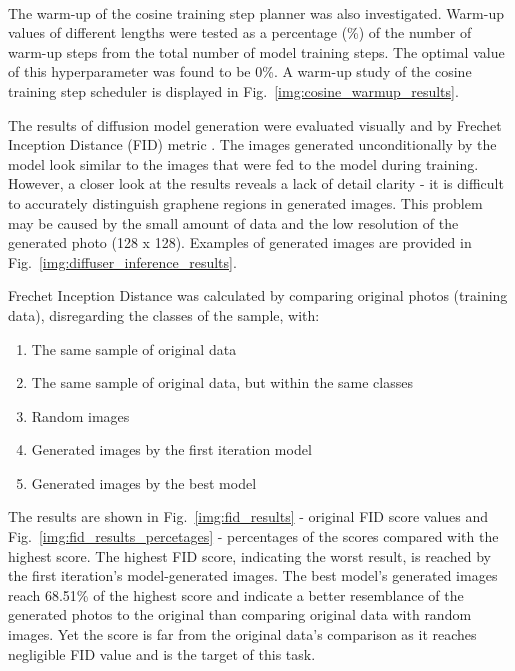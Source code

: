 \documentclass[runningheads]{llncs}
\begin{document}
\vspace{0.5cm} \\
The warm-up \cite{CosineScheduler} of the cosine training step planner was also investigated. Warm-up values of different lengths were tested as a percentage (\%) of the number of warm-up steps from the total number of model training steps. The optimal value of this hyperparameter was found to be 0\%. A warm-up study of the cosine training step scheduler is displayed in Fig.~\ref{img:cosine_warmup_results}.
\par
The results of diffusion model generation were evaluated visually and by Frechet Inception Distance (FID) metric \cite{fid}. The images generated unconditionally by the model look similar to the images that were fed to the model during training. However, a closer look at the results reveals a lack of detail clarity - it is difficult to accurately distinguish graphene regions in generated images. This problem may be caused by the small amount of data and the low resolution of the generated photo (128 x 128). Examples of generated images are provided in Fig.~\ref{img:diffuser_inference_results}. \par
Frechet Inception Distance was calculated by comparing original photos (training data), disregarding the classes of the sample, with:
\begin{enumerate}
    \item The same sample of original data
    \item The same sample of original data, but within the same classes
    \item Random images
    \item Generated images by the first iteration model
    \item Generated images by the best model
\end{enumerate}
The results are shown in Fig.~\ref{img:fid_results} - original FID score values and Fig.~\ref{img:fid_results_percetages} - percentages of the scores compared with the highest score. The highest FID score, indicating the worst result, is reached by the first iteration's model-generated images. The best model's generated images reach 68.51\% of the highest score and indicate a better resemblance of the generated photos to the original than comparing original data with random images. Yet the score is far from the original data's comparison as it reaches negligible FID value and is the target of this task.
\\
\end{document}
